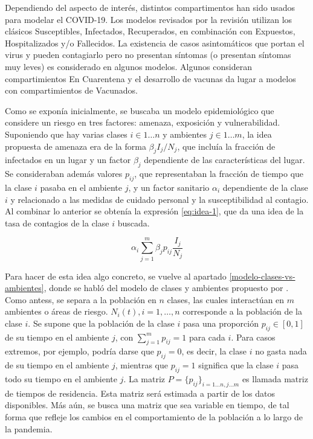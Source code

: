 
Dependiendo del aspecto de interés, distintos compartimentos han sido usados para modelar el COVID-19. Los modelos revisados por la revisión \cite{Xiang2021} utilizan los clásicos Susceptibles, Infectados, Recuperados, en combinación con Expuestos, Hospitalizados y/o Fallecidos. La existencia de casos asintomáticos que portan el virus y pueden contagiarlo pero no presentan síntomas (o presentan síntomas muy leves) es considerado en algunos modelos. Algunos consideran compartimientos En Cuarentena y el desarrollo de vacunas da lugar a modelos con compartimientos de Vacunados.

Como se exponía inicialmente, se buscaba un modelo epidemiológico que considere un riesgo en tres factores: amenaza, exposición y vulnerabilidad. Suponiendo que hay varias clases \(i \in 1 \dots n\) y ambientes \(j \in 1 \dots m\), la idea propuesta de amenaza era de la forma \(\beta_j I_j/N_j\), que incluía la fracción de infectados en un lugar y un factor \(\beta_j\) dependiente de las características del lugar. Se consideraban además valores \(p_{ij}\), que representaban la fracción de tiempo que la clase \(i\) pasaba en el ambiente \(j\), y un factor sanitario \(\alpha_i\) dependiente de la clase \(i\) y relacionado a las medidas de cuidado personal y la susceptibilidad al contagio. Al combinar lo anterior se obtenía la expresión \ref{eq:idea-1}, que da una idea de la tasa de contagios de la clase \(i\) buscada.

\begin{equation}\label{eq:idea-1}
\alpha_i \sum_{j = 1}^m \beta_j p_{ij} \frac{I_j}{N_j}
\end{equation}

Para hacer de esta idea algo concreto, se vuelve al apartado \ref{modelo-clases-vs-ambientes}, donde se habló del modelo de clases y ambientes propuesto por \cite{Bichara2015}\cite{Bichara2018}. Como antess, se separa a la población en \(n\) clases, las cuales interactúan en \(m\) ambientes o áreas de riesgo. \(N_i(t), i = 1, \dots, n\) corresponde a la población de la clase \(i\). Se supone que la población de la clase \(i\) pasa una proporción \(p_{ij} \in [0,1]\) de su tiempo en el ambiente \(j\), con \(\sum_{j = 1}^{m} p_{ij} = 1\) para cada \(i\). Para casos extremos, por ejemplo, podría darse que \(p_{ij} = 0\), es decir, la clase \(i\) no gasta nada de su tiempo en el ambiente \(j\), mientras que \(p_{ij} = 1\) significa que la clase \(i\) pasa todo su tiempo en el ambiente \(j\). La matriz \(P = \{p_{ij}\}_{i = 1\dots n,j \dots m}\) es llamada matriz de tiempos de residencia. Esta matriz será estimada a partir de los datos disponibles. Más aún, se busca una matriz que sea variable en tiempo, de tal forma que refleje los cambios en el comportamiento de la población a lo largo de la pandemia.


